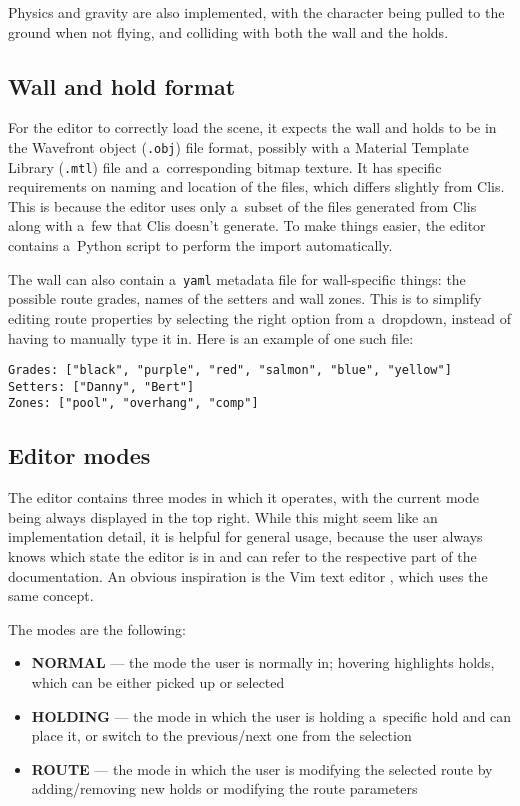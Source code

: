 Physics and gravity are also implemented, with the character being pulled to the ground when not flying, and colliding with both the wall and the holds.

\subsection{Wall and hold format}
For the editor to correctly load the scene, it expects the wall and holds to be in the Wavefront object (\verb|.obj|) file format, possibly with a Material Template Library (\verb|.mtl|) file and a~corresponding bitmap texture.
It has specific requirements on naming and location of the files, which differs slightly from Clis.
This is because the editor uses only a~subset of the files generated from Clis along with a~few that Clis doesn't generate.
To make things easier, the editor contains a~Python script to perform the import automatically.

The wall can also contain a~\verb|yaml| metadata file for wall-specific things: the possible route grades, names of the setters and wall zones.
This is to simplify editing route properties by selecting the right option from a~dropdown, instead of having to manually type it in.
Here is an example of one such file:

\begin{verbatim}
Grades: ["black", "purple", "red", "salmon", "blue", "yellow"]
Setters: ["Danny", "Bert"]
Zones: ["pool", "overhang", "comp"]
\end{verbatim}

\subsection{Editor modes}
The editor contains three modes in which it operates, with the current mode being always displayed in the top right.
While this might seem like an implementation detail, it is helpful for general usage, because the user always knows which state the editor is in and can refer to the respective part of the documentation.
An obvious inspiration is the Vim text editor \cite{vim}, which uses the same concept.

The modes are the following:

\begin{itemize}
	\item \textbf{NORMAL} --- the mode the user is normally in; hovering highlights holds, which can be either picked up or selected
	\item \textbf{HOLDING} --- the mode in which the user is holding a~specific hold and can place it, or switch to the previous/next one from the selection
	\item \textbf{ROUTE} --- the mode in which the user is modifying the selected route by adding/removing new holds or modifying the route parameters
\end{itemize}

